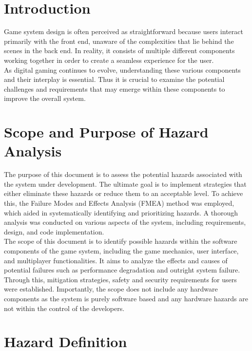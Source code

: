 \documentclass{article}
\begin{document}
\section{Introduction}

Game system design is often perceived as straightforward because users interact primarily with the front end, unaware of the complexities that lie behind the scenes in the back end. In reality, it consists of multiple different components working together in order to create a seamless experience for the user.\\

As digital gaming continues to evolve, understanding these various components and their interplay is essential. Thus it is crucial to examine the potential challenges and requirements that may emerge within these components to improve the overall system.

\section{Scope and Purpose of Hazard Analysis}

The purpose of this document is to assess the potential hazards associated with the system under development. The ultimate goal is to implement strategies that either eliminate these hazards or reduce them to an acceptable level. To achieve this, the Failure Modes and Effects Analysis (FMEA) method was employed, which aided in systematically identifying and prioritizing hazards. A thorough analysis was conducted on various aspects of the system, including requirements, design, and code implementation.\\

The scope of this document is to identify possible hazards within the software components of the game system, including the game mechanics, user interface, and multiplayer functionalities. It aims to analyze the effects and causes of potential failures such as performance degradation and outright system failure. Through this, mitigation strategies, safety and security requirements for users were established. Importantly, the scope does not include any hardware components as the system is purely software based and any hardware hazards are not within the control of the developers.

\section{Hazard Definition}
\end{document}
